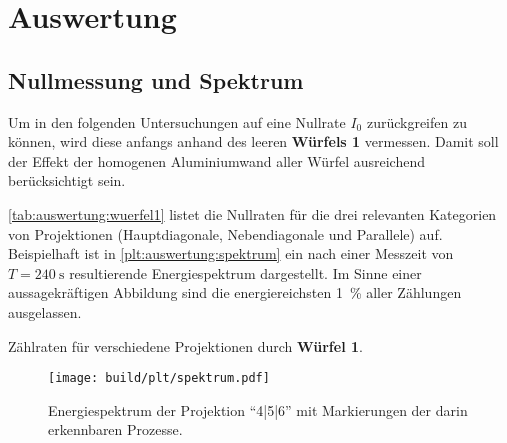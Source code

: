\section{Auswertung}
\label{sec:auswertung}

\subsection{Nullmessung und Spektrum}

Um in den folgenden Untersuchungen auf eine Nullrate $I_0$ zurückgreifen zu können,
wird diese anfangs anhand des leeren \textbf{Würfels 1} vermessen.
Damit soll der Effekt der homogenen Aluminiumwand aller Würfel ausreichend berücksichtigt sein.

\autoref{tab:auswertung:wuerfel1} listet die Nullraten für die drei relevanten Kategorien von Projektionen
(Hauptdiagonale, Nebendiagonale und Parallele)
auf.
Beispielhaft ist in \autoref{plt:auswertung:spektrum} ein nach einer Messzeit von $T = \SI{240}{\second}$ resultierende Energiespektrum dargestellt.
Im Sinne einer aussagekräftigen Abbildung sind die energiereichsten \SI{1}{\percent} aller Zählungen ausgelassen.

\begin{table}[H]
    \centering
    \caption{Zählraten für verschiedene Projektionen durch \textbf{Würfel 1}.}
    \label{tab:auswertung:wuerfel1}
\end{table}

\begin{figure}
    \centering
    \texttt{[image: build/plt/spektrum.pdf]}
    \caption{Energiespektrum der Projektion \enquote{4|5|6} mit Markierungen der darin erkennbaren Prozesse.}
    \label{plt:auswertung:spektrum}
\end{figure}


